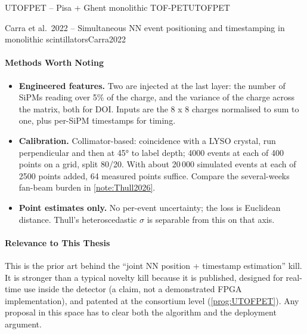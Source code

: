 \begin{programnote}{UTOFPET -- Pisa + Ghent monolithic TOF-PET}{UTOFPET}
\begin{papernote}{Carra et al.\ 2022 -- Simultaneous NN event positioning and timestamping in monolithic scintillators}{Carra2022}
\paragraph{Methods Worth Noting}
\begin{itemize}
	\item \textbf{Engineered features.} Two are injected at the last layer:
		the number of SiPMs reading over 5\% of the charge, and the variance of
		the charge across the matrix, both for DOI. Inputs are the 8 x 8
		charges normalised to sum to one, plus per-SiPM timestamps for timing.
	\item \textbf{Calibration.} Collimator-based: coincidence with a
		 LYSO crystal, run perpendicular and then at
		\ang{45} to label depth; 4000 events at each of 400 points on a
		 grid, split 80/20. With about 20\,000 simulated events at each
		of 2500 points added, 64 measured points suffice. Compare the
		several-weeks fan-beam burden in \ref{note:Thull2026}.
	\item \textbf{Point estimates only.} No per-event uncertainty; the loss
		is Euclidean distance. Thull's heteroscedastic $\sigma$ is separable
		from this on that axis.
\end{itemize}

\paragraph{Relevance to This Thesis}
This is the prior art behind the ``joint NN position + timestamp estimation''
kill. It is stronger than a typical novelty kill because it is published,
designed for real-time use inside the detector (a claim, not a demonstrated
FPGA implementation), and patented at the consortium level
(\ref{prog:UTOFPET}). Any proposal in this space has to clear both the
algorithm and the deployment argument.


\end{papernote}
\end{programnote}
